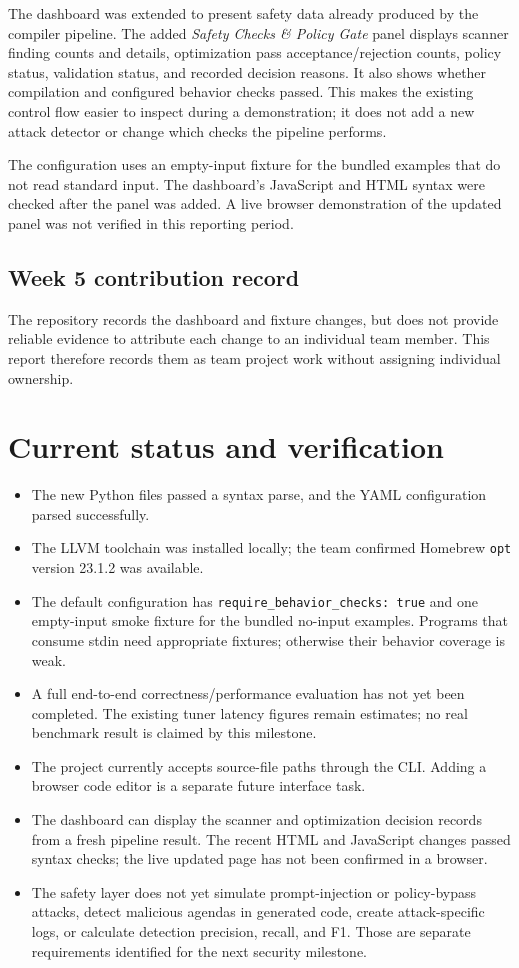 \documentclass[11pt]{article}
\begin{document}
The dashboard was extended to present safety data already produced by the compiler pipeline. The added \textit{Safety Checks \& Policy Gate} panel displays scanner finding counts and details, optimization pass acceptance/rejection counts, policy status, validation status, and recorded decision reasons. It also shows whether compilation and configured behavior checks passed. This makes the existing control flow easier to inspect during a demonstration; it does not add a new attack detector or change which checks the pipeline performs.

The configuration uses an empty-input fixture for the bundled examples that do not read standard input. The dashboard's JavaScript and HTML syntax were checked after the panel was added. A live browser demonstration of the updated panel was not verified in this reporting period.

\subsection*{Week 5 contribution record}
The repository records the dashboard and fixture changes, but does not provide reliable evidence to attribute each change to an individual team member. This report therefore records them as team project work without assigning individual ownership.

\section{Current status and verification}
\begin{itemize}
  \item The new Python files passed a syntax parse, and the YAML configuration parsed successfully.
  \item The LLVM toolchain was installed locally; the team confirmed Homebrew \texttt{opt} version 23.1.2 was available.
  \item The default configuration has \texttt{require\_behavior\_checks: true} and one empty-input smoke fixture for the bundled no-input examples. Programs that consume stdin need appropriate fixtures; otherwise their behavior coverage is weak.
  \item A full end-to-end correctness/performance evaluation has not yet been completed. The existing tuner latency figures remain estimates; no real benchmark result is claimed by this milestone.
  \item The project currently accepts source-file paths through the CLI. Adding a browser code editor is a separate future interface task.
  \item The dashboard can display the scanner and optimization decision records from a fresh pipeline result. The recent HTML and JavaScript changes passed syntax checks; the live updated page has not been confirmed in a browser.
  \item The safety layer does not yet simulate prompt-injection or policy-bypass attacks, detect malicious agendas in generated code, create attack-specific logs, or calculate detection precision, recall, and F1. Those are separate requirements identified for the next security milestone.
\end{itemize}
\end{document}
